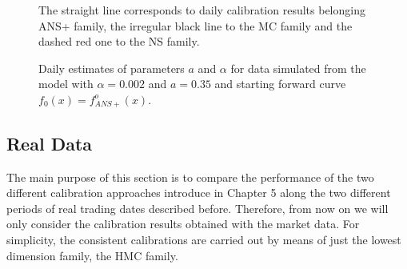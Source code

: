 \begin{figure}[p]
\caption{Daily estimates of parameters $a$ and $\alpha$ for data
  simulated from the model with $\alpha=0.002$ and $a=0.35$ and
  starting forward curve $f_0(x)=f^o_{ANS+}(x)$.\label{sim2}} 

\begin{center}

\begin{minipage}[r]{13cm}
\end{minipage}
\begin{minipage}[r]{13cm}
\end{minipage}
\end{center}
\begin{flushleft}
The straight line corresponds to daily calibration results belonging
ANS+ family, the irregular black line to the MC family and the dashed
red one to the NS family. 
\end{flushleft}
\end{figure}

\subsection*{Real Data}
The main purpose of this section is to compare the performance of the
two different calibration approaches introduce in Chapter 5 along the two
different periods of real trading dates described before. Therefore, from
now on we will only consider the calibration results obtained with the
market data. For simplicity, the consistent calibrations are carried
out by means of just the lowest dimension family, the HMC family.

